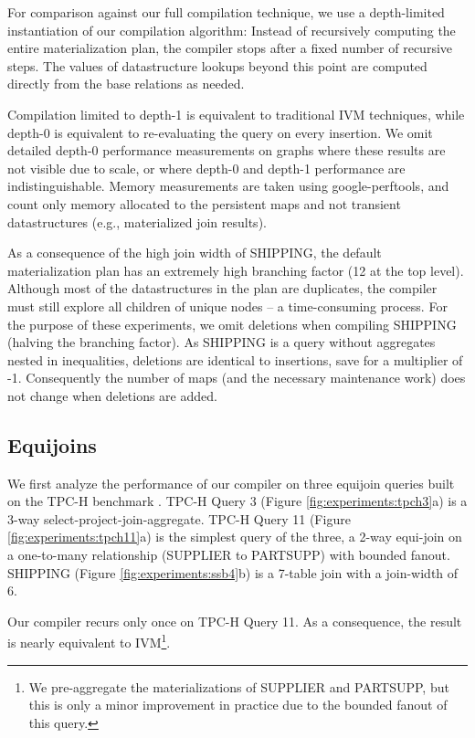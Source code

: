 For comparison against our full compilation technique, we use a depth-limited instantiation of our compilation algorithm: Instead of recursively computing the entire materialization plan, the compiler stops after a fixed number of recursive steps.  The values of datastructure lookups beyond this point are computed directly from the base relations as needed.

Compilation limited to depth-1 is equivalent to traditional IVM techniques, while depth-0 is equivalent to re-evaluating the query on every insertion.  We omit detailed depth-0 performance measurements on graphs where these results are not visible due to scale, or where depth-0 and depth-1 performance are indistinguishable.  Memory measurements are taken using google-perftools\cite{perftools}, and count only memory allocated to the persistent maps and not transient datastructures (e.g., materialized join results).

As a consequence of the high join width of SHIPPING, the default materialization plan has an extremely high branching factor (12 at the top level).  Although most of the datastructures in the plan are duplicates, the compiler must still explore all children of unique nodes -- a time-consuming process.  For the purpose of these experiments, we omit deletions when compiling SHIPPING (halving the branching factor).  As SHIPPING is a query without aggregates nested in inequalities, deletions are identical to insertions, save for a multiplier of -1.  Consequently the number of maps (and the necessary maintenance work) does not change when deletions are added.

\subsection{Equijoins}

We first analyze the performance of our compiler on three equijoin queries built on the TPC-H benchmark .  TPC-H Query 3 (Figure \ref{fig:experiments:tpch3}a) is a 3-way select-project-join-aggregate.  TPC-H Query 11 (Figure \ref{fig:experiments:tpch11}a) is the simplest query of the three, a 2-way equi-join on a one-to-many relationship (SUPPLIER to PARTSUPP) with bounded fanout.  SHIPPING (Figure \ref{fig:experiments:ssb4}b) is a 7-table join with a join-width of 6.  

Our compiler recurs only once on TPC-H Query 11.  As a consequence, the result is nearly equivalent to IVM\footnote{We pre-aggregate the materializations of SUPPLIER and PARTSUPP, but this is only a minor improvement in practice due to the bounded fanout of this query.}.  

